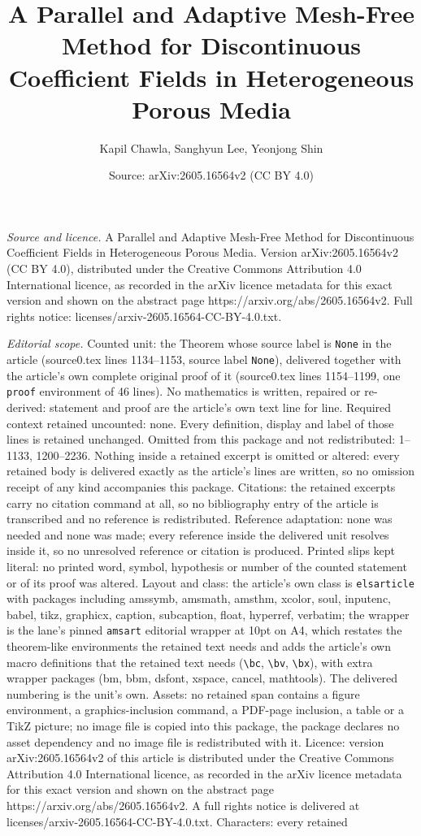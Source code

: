 \documentclass[10pt,a4paper]{amsart}
\title[A Parallel and Adaptive Mesh-Free Method for Discontinuous C]{A Parallel and Adaptive Mesh-Free Method for Discontinuous Coefficient Fields in Heterogeneous Porous Media}
\author{Kapil Chawla, Sanghyun Lee, Yeonjong Shin}
\date{Source: arXiv:2605.16564v2 (CC BY 4.0)}
\begin{document}
\maketitle

\noindent\emph{Source and licence.} A Parallel and Adaptive Mesh-Free Method for Discontinuous Coefficient Fields in Heterogeneous Porous Media. Version arXiv:2605.16564v2 (CC BY 4.0), distributed under the Creative Commons Attribution 4.0 International licence, as recorded in the arXiv licence metadata for this exact version and shown on the abstract page https://arxiv.org/abs/2605.16564v2. Full rights notice: licenses/arxiv-2605.16564-CC-BY-4.0.txt.\par\smallskip

\noindent\textit{Editorial scope.} Counted unit: the Theorem whose source label is \texttt{None} in the article (source0.tex lines 1134--1153, source label \texttt{None}), delivered together with the article's own complete original proof of it (source0.tex lines 1154--1199, one \texttt{proof} environment of 46 lines). No mathematics is written, repaired or re-derived: statement and proof are the article's own text line for line. Required context retained uncounted: none. Every definition, display and label of those lines is retained unchanged. Omitted from this package and not redistributed: 1--1133, 1200--2236. Nothing inside a retained excerpt is omitted or altered: every retained body is delivered exactly as the article's lines are written, so no omission receipt of any kind accompanies this package. Citations: the retained excerpts carry no citation command at all, so no bibliography entry of the article is transcribed and no reference is redistributed. Reference adaptation: none was needed and none was made; every reference inside the delivered unit resolves inside it, so no unresolved reference or citation is produced. Printed slips kept literal: no printed word, symbol, hypothesis or number of the counted statement or of its proof was altered. Layout and class: the article's own class is \texttt{elsarticle} with packages including amssymb, amsmath, amsthm, xcolor, soul, inputenc, babel, tikz, graphicx, caption, subcaption, float, hyperref, verbatim; the wrapper is the lane's pinned \texttt{amsart} editorial wrapper at 10pt on A4, which restates the theorem-like environments the retained text needs and adds the article's own macro definitions that the retained text needs (\texttt{\textbackslash bc}, \texttt{\textbackslash bv}, \texttt{\textbackslash bx}), with extra wrapper packages (bm, bbm, dsfont, xspace, cancel, mathtools). The delivered numbering is the unit's own. Assets: no retained span contains a figure environment, a graphics-inclusion command, a PDF-page inclusion, a table or a TikZ picture; no image file is copied into this package, the package declares no asset dependency and no image file is redistributed with it. Licence: version arXiv:2605.16564v2 of this article is distributed under the Creative Commons Attribution 4.0 International licence, as recorded in the arXiv licence metadata for this exact version and shown on the abstract page https://arxiv.org/abs/2605.16564v2. A full rights notice is delivered at licenses/arxiv-2605.16564-CC-BY-4.0.txt. Characters: every retained 
\end{document}
